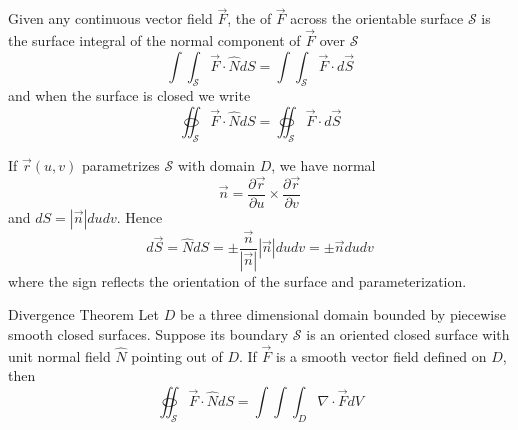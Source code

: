 \documentclass[12pt]{report}
\begin{document}
\begin{appendices}
    
    \begin{defn}{}{}
        Given any continuous vector field $\vec{F}$, the  of $\vec{F}$ across the orientable surface $\mathcal{S}$ is the surface integral of the normal component of $\vec{F}$ over $\mathcal{S}$ \begin{equation}
            \int\int_{\mathcal{S}}\vec{F}\cdot \hat{N}dS = \int\int_{\mathcal{S}}\vec{F}\cdot d\vec{S}
        \end{equation}
        and when the surface is closed we write \begin{equation}
            \oiint_{\mathcal{S}}\vec{F}\cdot \hat{N}dS = \oiint_{\mathcal{S}}\vec{F}\cdot d\vec{S}
        \end{equation}
    \end{defn}
    
    
    \begin{rmk}{}{}
        If $\vec{r}(u,v)$ parametrizes $\mathcal{S}$ with domain $D$, we have normal \begin{equation}
            \vec{n} = \frac{\partial \vec{r}}{\partial u}\times \frac{\partial \vec{r}}{\partial v}
        \end{equation}
        and $dS = |\vec{n}|dudv$. Hence \begin{equation}
            d\vec{S} = \hat{N}dS = \pm\frac{\vec{n}}{|\vec{n}|}|\vec{n}|dudv = \pm\vec{n}dudv
        \end{equation}
        where the sign reflects the orientation of the surface and parameterization.
    \end{rmk}
    
    \begin{namthm}{Divergence Theorem}
        Let $D$ be a three dimensional domain bounded by piecewise smooth closed surfaces. Suppose its boundary $\mathcal{S}$ is an oriented closed surface with unit normal field $\hat{N}$ pointing out of $D$. If $\vec{F}$ is a smooth vector field defined on $D$, then \begin{equation}
            \oiint_{\mathcal{S}}\vec{F}\cdot \hat{N}dS = \int\int\int_D\nabla\cdot \vec{F}dV
        \end{equation}
    \end{namthm}
    
\end{appendices}
\end{document}
